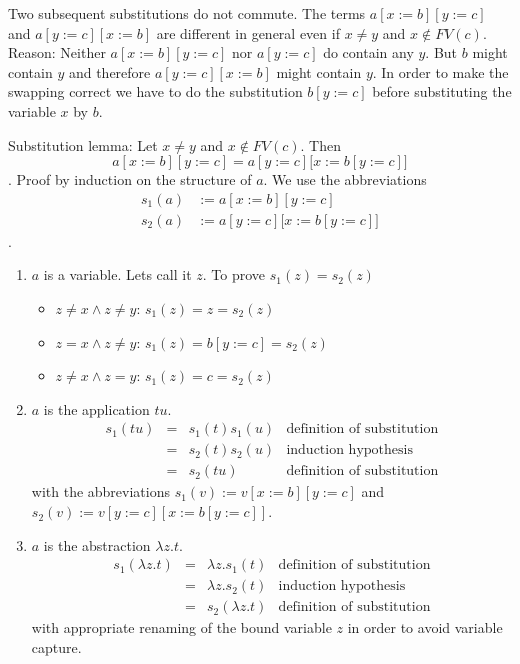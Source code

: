 Two subsequent substitutions do not commute. The terms $a[x:=b][y:=c]$ and
$a[y:=c][x:=b]$ are different in general even if $x \ne y$ and
$x \notin FV(c)$. Reason: Neither $a[x:=b][y:=c]$ nor $a[y:=c]$ do contain any
$y$. But $b$ might contain $y$ and therefore $a[y:=c][x:=b]$ might contain
$y$. In order to make the swapping correct we have to do the substitution
$b[y:=c]$ before substituting the variable $x$ by $b$.

\begin{theorem} Substitution lemma: Let $x \ne y$ and $x \notin
  FV(c)$. Then $$a[x:=b][y:=c] = a[y:=c]\big[x:= b[y:=c]\big]$$. Proof by
  induction on the structure of $a$. We use the abbreviations
  $$\begin{array}{ll}
      s_1(a) &:= a[x:=b][y:=c] \\
      s_2(a) &:= a[y:=c]\big[x:=b[y:=c]\big]
    \end{array}$$.
  \begin{enumerate}
  \item $a$ is a variable. Lets call it $z$. To prove $s_1(z) = s_2(z)$
    \begin{itemize}
    \item $z \ne x \land z \ne y$: $s_1(z) = z = s_2(z)$
    \item $z = x \land z \ne y$: $s_1(z) = b[y:=c] = s_2(z)$
    \item $z \ne x \land z = y$: $s_1(z) = c = s_2(z)$
    \end{itemize}
  \item $a$ is the application $t u$.
    $$\begin{array}{llll}
        s_1(t u) &=& s_1(t) s_1(u) & \text{definition of substitution}\\
       &=& s_2(t) s_2(u) & \text{induction hypothesis}\\
        &=& s_2(t u) & \text{definition of substitution}
      \end{array}$$
      with the abbreviations $s_1(v) := v[x:=b][y:=c]$ and $s_2(v) :=
      v[y:=c][x:=b[y:=c]]$.
    \item $a$ is the abstraction $\lambda z.t$.
    $$\begin{array}{llll}
        s_1(\lambda z. t) &=& \lambda z. s_1(t)  & \text{definition of substitution}\\
       &=& \lambda z. s_2(t) & \text{induction hypothesis}\\
        &=& s_2(\lambda z.t) & \text{definition of substitution}
      \end{array}$$
      with appropriate renaming of the bound variable $z$ in order to avoid
      variable capture.
  \end{enumerate}
\end{theorem}





